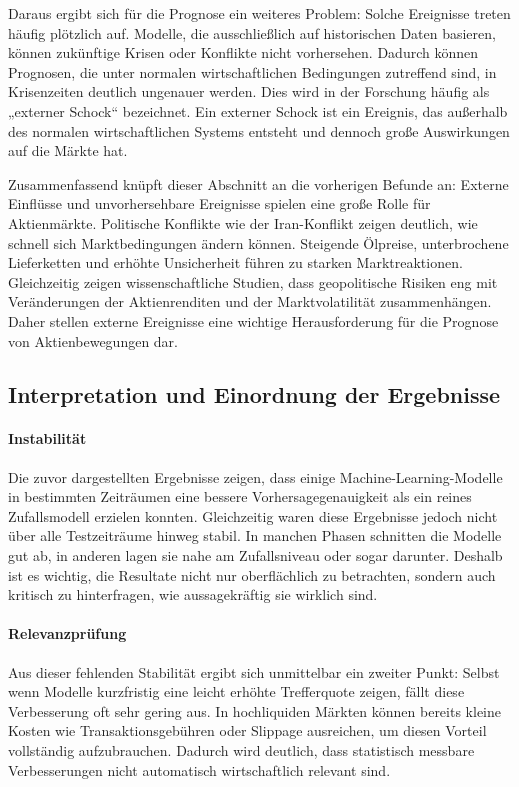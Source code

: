 Daraus ergibt sich für die Prognose ein weiteres Problem: Solche Ereignisse treten häufig plötzlich auf. Modelle, die ausschließlich auf historischen Daten basieren, können zukünftige Krisen oder Konflikte nicht vorhersehen. Dadurch können Prognosen, die unter normalen wirtschaftlichen Bedingungen zutreffend sind, in Krisenzeiten deutlich ungenauer werden. Dies wird in der Forschung häufig als „externer Schock“ bezeichnet. Ein externer Schock ist ein Ereignis, das außerhalb des normalen wirtschaftlichen Systems entsteht und dennoch große Auswirkungen auf die Märkte hat.

Zusammenfassend knüpft dieser Abschnitt an die vorherigen Befunde an: Externe Einflüsse und unvorhersehbare Ereignisse spielen eine große Rolle für Aktienmärkte. Politische Konflikte wie der Iran-Konflikt zeigen deutlich, wie schnell sich Marktbedingungen ändern können. Steigende Ölpreise, unterbrochene Lieferketten und erhöhte Unsicherheit führen zu starken Marktreaktionen. Gleichzeitig zeigen wissenschaftliche Studien, dass geopolitische Risiken eng mit Veränderungen der Aktienrenditen und der Marktvolatilität zusammenhängen. Daher stellen externe Ereignisse eine wichtige Herausforderung für die Prognose von Aktienbewegungen dar.



\subsection{Interpretation und Einordnung der Ergebnisse}
\paragraph{Instabilität}
Die zuvor dargestellten Ergebnisse zeigen, dass einige Machine-Learning-Modelle in bestimmten Zeiträumen eine bessere Vorhersagegenauigkeit als ein reines Zufallsmodell erzielen konnten. Gleichzeitig waren diese Ergebnisse jedoch nicht über alle Testzeiträume hinweg stabil. In manchen Phasen schnitten die Modelle gut ab, in anderen lagen sie nahe am Zufallsniveau oder sogar darunter. Deshalb ist es wichtig, die Resultate nicht nur oberflächlich zu betrachten, sondern auch kritisch zu hinterfragen, wie aussagekräftig sie wirklich sind.

\paragraph{Relevanzprüfung}
Aus dieser fehlenden Stabilität ergibt sich unmittelbar ein zweiter Punkt: Selbst wenn Modelle kurzfristig eine leicht erhöhte Trefferquote zeigen, fällt diese Verbesserung oft sehr gering aus. In hochliquiden Märkten können bereits kleine Kosten wie Transaktionsgebühren oder Slippage ausreichen, um diesen Vorteil vollständig aufzubrauchen. Dadurch wird deutlich, dass statistisch messbare Verbesserungen nicht automatisch wirtschaftlich relevant sind.
